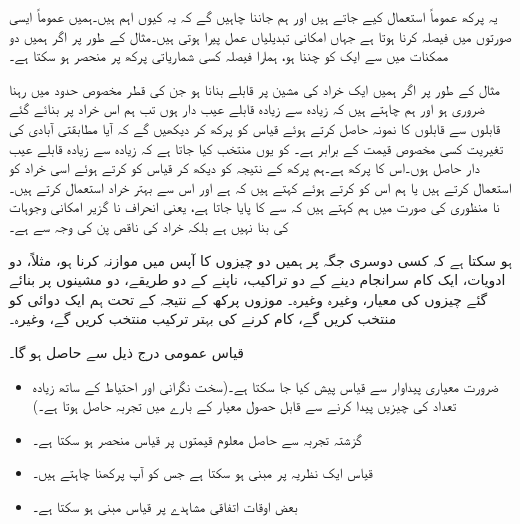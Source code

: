 یہ پرکھ عموماً استعمال کیے جاتے ہیں اور ہم جاننا چاہیں گے کہ یہ کیوں اہم ہیں۔ہمیں عموماً ایسی صورتوں میں فیصلہ کرنا ہوتا ہے جہاں امکانی تبدیلیاں عمل پیرا ہوتی ہیں۔مثال کے طور پر اگر ہمیں دو ممکنات میں سے ایک کو چننا ہو، ہمارا فیصلہ کسی شماریاتی پرکھ پر منحصر ہو سکتا ہے۔

مثال کے طور پر اگر ہمیں ایک خراد کی مشین پر قابلے بنانا ہو جن کی قطر مخصوص حدود میں رہنا ضروری ہو اور ہم چاہتے ہیں کہ زیادہ سے زیادہ  قابلے عیب دار ہوں تب ہم اس خراد پر بنائے گئے قابلوں سے  قابلوں کا نمونہ حاصل کرتے ہوئے قیاس  کو پرکھ کر دیکھیں گے کہ آیا مطابقتی آبادی کی تغیریت  کسی مخصوص قیمت  کے برابر ہے۔ کو یوں منتخب کیا جاتا ہے کہ زیادہ سے زیادہ   قابلے عیب دار حاصل ہوں۔اس کا  پرکھ  ہے۔ہم پرکھ کے نتیجہ کو دیکھ کر قیاس  کو  کرتے ہوئے اسی خراد کو استعمال کرتے ہیں یا ہم اس کو  کرتے ہوئے کہتے ہیں کہ  ہے اور اس سے بہتر خراد استعمال کرتے ہیں۔نا منظوری کی صورت میں ہم کہتے ہیں کہ  سے  کا  پایا جاتا ہے، یعنی انحراف نا گزیر  امکانی وجوہات کی بنا نہیں ہے بلکہ خراد کی ناقص پن کی وجہ سے ہے۔

ہو سکتا ہے کہ کسی دوسری جگہ پر ہمیں دو چیزوں کا آپس میں موازنہ کرنا ہو، مثلاً، دو ادویات، ایک کام سرانجام دینے کے دو تراکیب، ناپنے کے دو طریقے، دو مشینوں پر بنائے گئے چیزوں کی معیار، وغیرہ وغیرہ۔ موزوں پرکھ کے نتیجہ کے تحت ہم ایک دوائی کو منتخب کریں گے، کام کرنے کی بہتر ترکیب منتخب کریں گے، وغیرہ۔

قیاس عمومی درج ذیل سے حاصل ہو گا۔
\begin{itemize}
\item
ضرورت معیاری پیداوار سے قیاس پیش کیا جا سکتا ہے۔(سخت نگرانی اور احتیاط کے ساتھ زیادہ تعداد کی چیزیں پیدا کرنے سے قابل حصول معیار کے بارے میں تجربہ حاصل ہوتا ہے۔)\\
\item
گزشتہ تجربہ سے حاصل معلوم قیمتوں پر قیاس منحصر ہو سکتا ہے۔\\
\item
قیاس ایک نظریہ پر مبنی ہو سکتا ہے جس کو آپ پرکھنا چاہتے ہیں۔\\
\item
بعض اوقات اتفاقی مشاہدے پر قیاس مبنی ہو سکتا ہے۔   
\end{itemize}  

